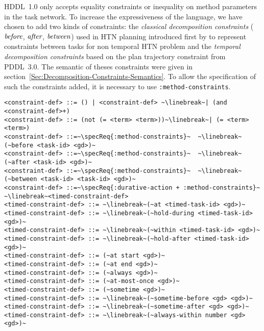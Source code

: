 \documentclass[letterpaper]{article} %
\newcommand{\before}{\text{\it before}}
\newcommand{\after}{\text{\it after}}
\renewcommand{\between}{\text{\it between}}
\begin{document}
%
%
HDDL~1.0 only accepts equality constraints or inequality on method parameters in the task network. To increase the expressiveness of the language, we have chosen to add two kinds of constraints: the {\em classical decomposition constraints} ($\before$, $\after$, $\between$) used in HTN planning introduced first by \citep{erol94} to represent constraints between tasks for non temporal HTN problem and the {\em temporal decomposition constraints} based on the plan trajectory constraint from PDDL~3.0. The semantic of theses constraints were given in section~\ref{Sec:Decomposition-Constraints-Semantics}. To allow the specification of such the constraints added, it is necessary to use \verb+:method-constraints+.

\begin{lstlisting}[firstnumber=last, basicstyle=\fontsize{8.5}{10}\selectfont\ttfamily, escapechar=~]
<constraint-def> ::= () | <constraint-def> ~\linebreak~| (and <constraint-def>+)
<constraint-def> ::= (not (= <term> <term>))~\linebreak~| (= <term> <term>)
<constraint-def> ::=~\specReq{:method-constraints}~  ~\linebreak~(~before <task-id> <gd>)~
<constraint-def> ::=~\specReq{:method-constraints}~  ~\linebreak~(~after <task-id> <gd>)~
<constraint-def> ::=~\specReq{:method-constraints}~  ~\linebreak~(~between <task-id> <task-id> <gd>)~
<constraint-def> ::=~\specReq{:durative-action + :method-constraints}~ ~\linebreak~<timed-constraint-def>
<timed-constraint-def> ::= ~\linebreak~(~at <timed-task-id> <gd>)~
<timed-constraint-def> ::= ~\linebreak~(~hold-during <timed-task-id> <gd>)~
<timed-constraint-def> ::= ~\linebreak~(~within <timed-task-id> <gd>)~
<timed-constraint-def> ::= ~\linebreak~(~hold-after <timed-task-id> <gd>)~
<timed-constraint-def> ::= (~at start <gd>)~
<timed-constraint-def> ::= (~at end <gd>)~
<timed-constraint-def> ::= (~always <gd>)~
<timed-constraint-def> ::= (~at-most-once <gd>)~
<timed-constraint-def> ::= (~sometime <gd>)~
<timed-constraint-def> ::= ~\linebreak~(~sometime-before <gd> <gd>)~
<timed-constraint-def> ::= ~\linebreak~(~sometime-after <gd> <gd>)~
<timed-constraint-def> ::= ~\linebreak~(~always-within number <gd> <gd>)~
\end{lstlisting}
\end{document}
